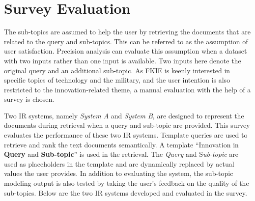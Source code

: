 \section{Survey Evaluation}

The sub-topics are assumed to help the user by retrieving the documents that are related to the query and sub-topics. This can be referred to as the assumption of user satisfaction. Precision analysis can evaluate this assumption when a dataset with two inputs rather than one input is available. Two inputs here denote the original query and an additional sub-topic. As \ac{FKIE} is keenly interested in specific topics of technology and the military, and the user intention is also restricted to the innovation-related theme, a manual evaluation with the help of a survey is chosen.


Two \ac{IR} systems, namely \emph{System A} and \emph{System B}, are designed to represent the documents during retrieval when a query and sub-topic are provided. This survey evaluates the performance of these two \ac{IR} systems. Template queries are used to retrieve and rank the text documents semantically. A template ``Innovation in \textbf{Query} and \textbf{Sub-topic}'' is used in the retrieval. The \emph{Query} and S\emph{ub-topic} are used as placeholders in the template and are dynamically replaced by actual values the user provides. In addition to evaluating the system, the sub-topic modeling output is also tested by taking the user's feedback on the quality of the sub-topics. Below are the two \ac{IR} systems developed and evaluated in the survey.


